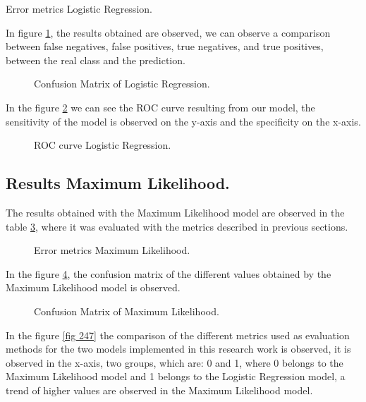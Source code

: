 \documentclass[letterpaper,12pt,openright,oneside]{article}
\begin{document}
\begin{table}[H]
\centerline{}
\caption{Error metrics Logistic Regression.}
\label{fig 207}
\end{table}

In figure \ref{fig 208}, the results obtained are observed, we can observe a comparison between false negatives, false positives, true negatives, and true positives, between the real class and the prediction.

\begin{figure}[H]
\centerline{}
\caption{Confusion Matrix of Logistic Regression.}
\label{fig 208}
\end{figure}


In the figure \ref{fig 209} we can see the ROC curve resulting from our model, the sensitivity of the model is observed on the y-axis and the specificity on the x-axis.

\begin{figure}[H]
\centerline{}
\caption{ROC curve Logistic Regression.}
\label{fig 209}
\end{figure}


\subsection{Results Maximum Likelihood.}


The results obtained with the Maximum Likelihood model are observed in the table \ref{fig c55}, where it was evaluated with the metrics described in previous sections.


\begin{figure}[H]
\centerline{}
\caption{Error metrics Maximum Likelihood.}
\label{fig c55}
\end{figure}

In the figure \ref{fig 225}, the confusion matrix of the different values obtained by the Maximum Likelihood model is observed.

\begin{figure}[H]
\centerline{}
\caption{Confusion Matrix of Maximum Likelihood.}
\label{fig 225}
\end{figure}


In the figure \ref{fig 247} the comparison of the different metrics used as evaluation methods for the two models implemented in this research work is observed, it is observed in the x-axis, two groups, which are: 0 and 1, where 0 belongs to the Maximum Likelihood model and 1 belongs to the Logistic Regression model, a trend of higher values are observed in the Maximum Likelihood model.
\end{document}
